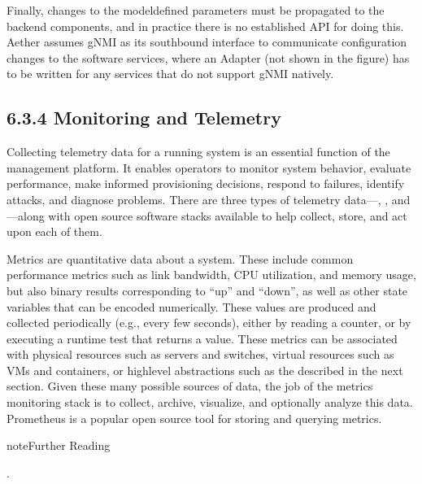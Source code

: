 \documentclass[a4paper,11pt,english]{sphinxmanual}
\begin{document}
\sphinxAtStartPar
Finally, changes to the model\sphinxhyphen{}defined parameters must be propagated to
the backend components, and in practice there is no established
API for doing this. Aether assumes gNMI as its southbound interface to
communicate configuration changes to the software services, where an
Adapter (not shown in the figure) has to be written for any services
that do not support gNMI natively.


\subsection{6.3.4 Monitoring and Telemetry}
\label{\detokenize{cloud:monitoring-and-telemetry}}
\sphinxAtStartPar
Collecting telemetry data for a running system is an essential
function of the management platform. It enables operators to monitor
system behavior, evaluate performance, make informed provisioning
decisions, respond to failures, identify attacks, and diagnose
problems. There are three types of telemetry data—, ,
and —along with open source software stacks available to help
collect, store, and act upon each of them.

\sphinxAtStartPar
Metrics are quantitative data about a system. These include common
performance metrics such as link bandwidth, CPU utilization, and
memory usage, but also binary results corresponding to “up” and
“down”, as well as other state variables that can be encoded
numerically. These values are produced and collected periodically
(e.g., every few seconds), either by reading a counter, or by
executing a runtime test that returns a value. These metrics can be
associated with physical resources such as servers and switches,
virtual resources such as VMs and containers, or high\sphinxhyphen{}level
abstractions such as the  described in the next
section. Given these many possible sources of data, the job of the
metrics monitoring stack is to collect, archive, visualize, and
optionally analyze this data. Prometheus is a popular open source tool
for storing and querying metrics.

\label{\detokenize{cloud:reading-monitor}}
\begin{sphinxadmonition}{note}{Further Reading}

\sphinxAtStartPar
{}.
\end{sphinxadmonition}
\end{document}
